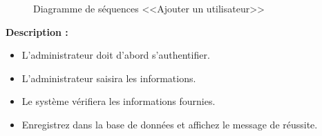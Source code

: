 \documentclass[12pt]{report}
\begin{document}
\newpage

\begin{figure}[h]
\centering
    \centerline{}
    \caption{Diagramme de séquences <<Ajouter un utilisateur>>}
\end{figure}

\vspace{0.3in}

\textbf{Description :}

\begin{itemize}
    \item L'administrateur doit d'abord s'authentifier.
    \item L'administrateur saisira les informations.
    \item Le système vérifiera les informations fournies.
    \item Enregistrez dans la base de données et affichez le message de réussite.
\end{itemize}

\newpage
\end{document}
